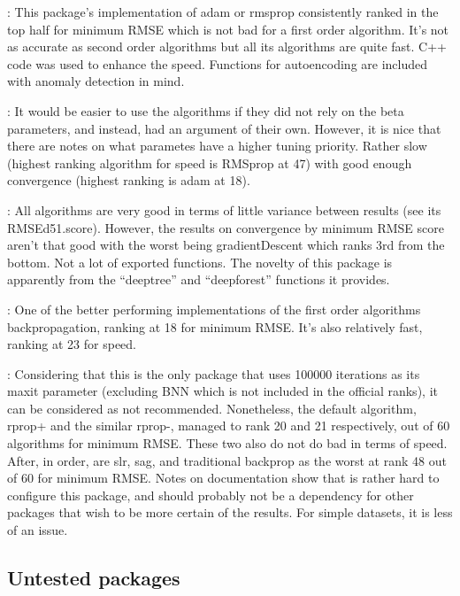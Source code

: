  \citep{R-ANN2}: This package's implementation of adam or
rmsprop consistently ranked in the top half for minimum RMSE which is
not bad for a first order algorithm. It's not as accurate as second
order algorithms but all its algorithms are quite fast. \textsf{C++}
code was used to enhance the speed. Functions for autoencoding are
included with anomaly detection in mind.

 \citep{R-automl}: It would be easier to use the
algorithms if they did not rely on the beta parameters, and instead, had
an argument of their own. However, it is nice that there are notes on
what parametes have a higher tuning priority. Rather slow (highest
ranking algorithm for speed is RMSprop at 47) with good enough
convergence (highest ranking is adam at 18).

 \citep{R-deepdive}: All algorithms are very good in
terms of little variance between results (see its RMSEd51.score).
However, the results on convergence by minimum RMSE score aren't that
good with the worst being gradientDescent which ranks 3rd from the
bottom. Not a lot of exported functions. The novelty of this package is
apparently from the ``deeptree'' and ``deepforest'' functions it
provides.

 \citep{R-deepnet}: One of the better performing
implementations of the first order algorithms backpropagation, ranking
at 18 for minimum RMSE. It's also relatively fast, ranking at 23 for
speed.

 \citep{R-neuralnet}: Considering that this is the
only package that uses 100000 iterations as its maxit parameter
(excluding BNN which is not included in the official ranks), it can be
considered as not recommended. Nonetheless, the default algorithm,
rprop+ and the similar rprop-, managed to rank 20 and 21 respectively,
out of 60 algorithms for minimum RMSE. These two also do not do bad in
terms of speed. After, in order, are slr, sag, and traditional backprop
as the worst at rank 48 out of 60 for minimum RMSE. Notes on
documentation show that is rather hard to configure this package, and
should probably not be a dependency for other packages that wish to be
more certain of the results. For simple datasets, it is less of an
issue.

\hypertarget{untested-packages}{%
\subsection{Untested packages}\label{untested-packages}}

